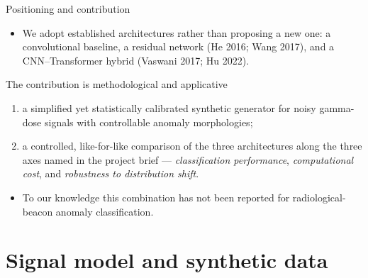 \documentclass[11pt, aspectratio=169]{beamer}
\begin{document}
\begin{frame}{Positioning and contribution}
  \begin{itemize}
    \item We \alert{adopt established architectures} rather than proposing a new
          one: a convolutional baseline, a residual network (He 2016; Wang 2017),
          and a CNN--Transformer hybrid (Vaswani 2017; Hu 2022).
  \end{itemize}
  \begin{block}{The contribution is methodological and applicative}
    \begin{enumerate}
      \item a \alert{simplified yet statistically calibrated} synthetic
            generator for noisy gamma-dose signals with controllable anomaly
            morphologies;
      \item a controlled, \alert{like-for-like comparison} of the three
            architectures along the three axes named in the project brief ---
            \emph{classification performance}, \emph{computational cost}, and
            \emph{robustness to distribution shift}.
    \end{enumerate}
  \end{block}
  \begin{itemize}
    \item To our knowledge this combination has not been reported for
          radiological-beacon anomaly classification.
  \end{itemize}
\end{frame}

\section{Signal model and synthetic data}
\end{document}

